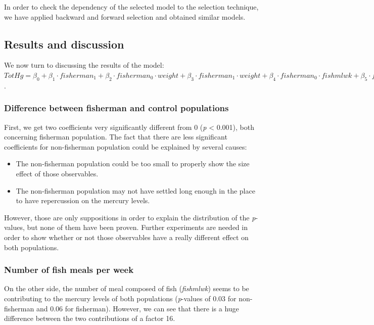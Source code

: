 \documentclass[12pt,]{article}
\providecommand{\tightlist}{%
  \setlength{\itemsep}{0pt}\setlength{\parskip}{0pt}}
\begin{document}
In order to check the dependency of the selected model to the selection
technique, we have applied backward and forward selection and obtained
similar models.

\subsection{Results and discussion}\label{results-and-discussion}

We now turn to discussing the results of the model:
\(TotHg = \beta_0 + \beta_1 \cdot fisherman_1 + \beta_2 \cdot fisherman_0 \cdot weight + \beta_3 \cdot fisherman_1 \cdot weight + \beta_4 \cdot fisherman_0 \cdot fishmlwk + \beta_5 \cdot fisherman_1 \cdot fishmlwk\).

\subsubsection{Difference between fisherman and control
populations}\label{difference-between-fisherman-and-control-populations}

First, we get two coefficients very significantly different from 0
(\emph{p} \textless{} 0.001), both concerning fisherman population. The
fact that there are less significant coefficients for non-fisherman
population could be explained by several causes:

\begin{itemize}
\tightlist
\item
  The non-fisherman population could be too small to properly show the
  size effect of those observables.
\item
  The non-fisherman population may not have settled long enough in the
  place to have repercussion on the mercury levels.
\end{itemize}

However, those are only suppositions in order to explain the
distribution of the \emph{p}-values, but none of them have been proven.
Further experiments are needed in order to show whether or not those
observables have a really different effect on both populations.

\subsubsection{Number of fish meals per
week}\label{number-of-fish-meals-per-week}

On the other side, the number of meal composed of fish (\emph{fishmlwk})
seems to be contributing to the mercury levels of both populations
(\emph{p}-values of 0.03 for non-fisherman and 0.06 for fisherman).
However, we can see that there is a huge difference between the two
contributions of a factor 16.
\end{document}

